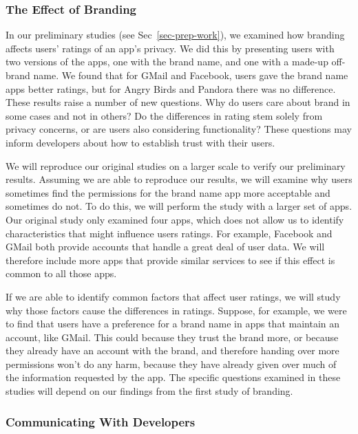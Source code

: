 \documentclass[11pt]{article}
\begin{document}
\subsubsection{The Effect of Branding}
\label{subsubsec-branding}

In our preliminary studies (see Sec~\ref{sec-prep-work}), we examined how branding 
affects users' ratings of an app's privacy. We did this by presenting users with
two versions of the apps, one with the brand name, and one with a made-up off-brand
name. We found that for GMail and Facebook, users gave the brand name apps better
ratings, but for Angry Birds and Pandora there was no difference. These results raise
a number of new questions. Why do users care about brand in some cases and not in others?
Do the differences in rating stem solely from privacy concerns, or are users also
considering functionality? These questions may inform developers about how to establish
trust with their users.

We will reproduce our original studies on a larger scale to verify our
preliminary results. Assuming we are able to reproduce our results, we
will examine why users sometimes find the permissions for the
brand name app more acceptable and sometimes do not. To do this, we
will perform the study with a larger set of apps. Our original
study only examined four apps, which does not allow us to
identify characteristics that might influence users ratings. For
example, Facebook and GMail both provide accounts that handle a great
deal of user data. We will therefore include more apps that provide
similar services to see if this effect is common to all those apps.

If we are able to identify common factors that affect user ratings, we
will study why those factors cause the differences in
ratings. Suppose, for example, we were to find that users have a
preference for a brand name in apps that maintain an account, like
GMail. This could because they trust the brand more, or because they
already have an account with the brand, and therefore handing over
more permissions won't do any harm, because they have already given
over much of the information requested by the app.  The specific
questions examined in these studies will depend on our findings from
the first study of branding.

\subsubsection{Communicating With Developers}
\label{subsubsec-dev-comm}
\end{document}
